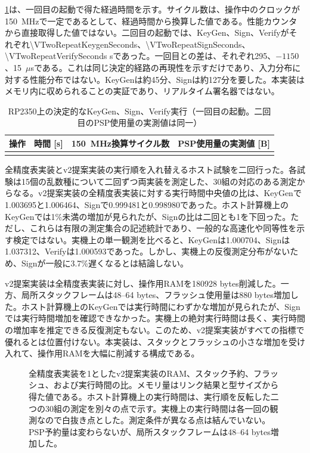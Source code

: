 \documentclass[a4paper,10pt]{ltjsarticle}
\theoremstyle{definition}
\theoremstyle{remark}
\begin{document}
\cref{tab:target-runtime}は、一回目の起動で得た経過時間を示す。サイクル数は、操作中のクロックが\SI{150}{\mega\hertz}で一定であるとして、経過時間から換算した値である。性能カウンタから直接取得した値ではない。二回目の起動では、KeyGen、Sign、Verifyがそれぞれ\num{\VTwoRepeatKeygenSeconds}、\num{\VTwoRepeatSignSeconds}、\num{\VTwoRepeatVerifySeconds} sであった。一回目との差は、それぞれ295、$-1150$、15~$\mu$sである。これは同じ決定的経路の再現性を示すだけであり、入力分布に対する性能分布ではない。KeyGenは約45分、Signは約127分を要した。本実装はメモリ内に収められることの実証であり、リアルタイム署名器ではない。

\begin{table}[H]
  \centering
  \caption{RP2350上の決定的なKeyGen、Sign、Verify実行（一回目の起動。二回目のPSP使用量の実測値は同一）}
  \label{tab:target-runtime}
  \small
  \begin{tabular}{@{}lrrr@{}}
    \toprule
    操作 & 時間 [s] & \SI{150}{\mega\hertz}換算サイクル数 & PSP使用量の実測値 [B] \\
    \midrule
    \\
    \bottomrule
  \end{tabular}
\end{table}

全精度表実装とv2提案実装の実行順を入れ替えるホスト試験を二回行った。各試験は15個の乱数種について二回ずつ両実装を測定した、30組の対応のある測定からなる。v2提案実装の全精度表実装に対する実行時間中央値の比は、KeyGenで\num{1.003695}と\num{1.006464}、Signで\num{0.999481}と\num{0.998980}であった。ホスト計算機上のKeyGenでは1\%未満の増加が見られたが、Signの比は二回とも1を下回った。ただし、これらは有限の測定集合の記述統計であり、一般的な高速化や同等性を示す検定ではない。実機上の単一観測を比べると、KeyGenは\num{1.000704}、Signは\num{1.037312}、Verifyは\num{1.000593}であった。しかし、実機上の反復測定分布がないため、Signが一般に\num{3.7}\%遅くなるとは結論しない。

v2提案実装は全精度表実装に対し、操作用RAMを\num{180928} bytes削減した。一方、局所スタックフレームは48--64 bytes、フラッシュ使用量は\num{880} bytes増加した。ホスト計算機上のKeyGenでは実行時間にわずかな増加が見られたが、Signでは実行時間増加を確認できなかった。実機上の絶対実行時間は長く、実行時間の増加率を推定できる反復測定もない。このため、v2提案実装がすべての指標で優れるとは位置付けない。本実装は、スタックとフラッシュの小さな増加を受け入れて、操作用RAMを大幅に削減する構成である。

\begin{figure}[H]
  \centering
  
  \caption{全精度表実装を1としたv2提案実装のRAM、スタック予約、フラッシュ、および実行時間の比。メモリ量はリンク結果と型サイズから得た値である。ホスト計算機上の実行時間は、実行順を反転した二つの30組の測定を別々の点で示す。実機上の実行時間は各一回の観測なので白抜き点とした。測定条件が異なる点は結んでいない。PSP予約量は変わらないが、局所スタックフレームは48--64 bytes増加した。}
  \label{fig:tradeoff}
\end{figure}
\end{document}
